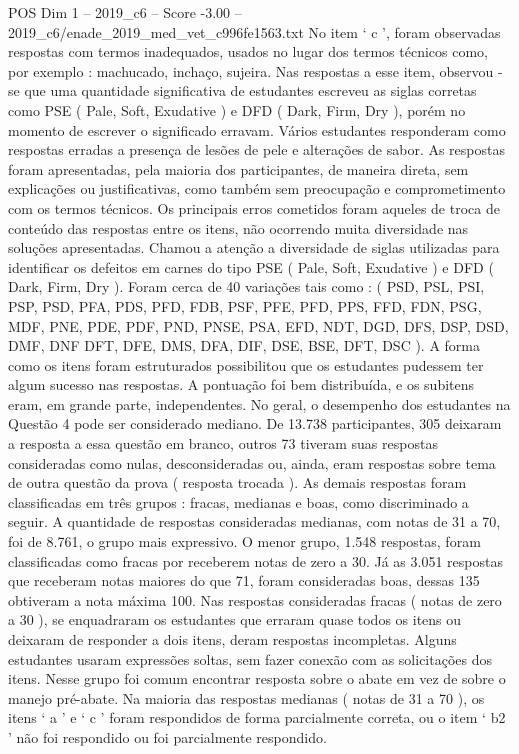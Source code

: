 \begin{textsample}{POS Dim 1 – 2019\_c6 – Score -3.00 – 2019\_c6/enade\_2019\_med\_vet\_c996fe1563.txt}
No item ‘ c ’, foram observadas respostas com termos inadequados, usados no lugar dos termos técnicos como, por exemplo : machucado, inchaço, sujeira.
Nas respostas a esse item, observou -se que uma quantidade significativa de estudantes escreveu as siglas corretas como PSE ( Pale, Soft, Exudative ) e DFD ( Dark, Firm, Dry ), porém no momento de escrever o significado erravam.
Vários estudantes responderam como respostas erradas a presença de lesões de pele e alterações de sabor.
As respostas foram apresentadas, pela maioria dos participantes, de maneira direta, sem explicações ou justificativas, como também sem preocupação e comprometimento com os termos técnicos.
Os principais erros cometidos foram aqueles de troca de conteúdo das respostas entre os itens, não ocorrendo muita diversidade nas soluções apresentadas.
Chamou a atenção a diversidade de siglas utilizadas para identificar os defeitos em carnes do tipo PSE ( Pale, Soft, Exudative ) e DFD ( Dark, Firm, Dry ).
Foram cerca de 40 variações tais como : ( PSD, PSL, PSI, PSP, PSD, PFA, PDS, PFD, FDB, PSF, PFE, PFD, PPS, FFD, FDN, PSG, MDF, PNE, PDE, PDF, PND, PNSE, PSA, EFD, NDT, DGD, DFS, DSP, DSD, DMF, DNF DFT, DFE, DMS, DFA, DIF, DSE, BSE, DFT, DSC ).
A forma como os itens foram estruturados possibilitou que os estudantes pudessem ter algum sucesso nas respostas.
A pontuação foi bem distribuída, e os subitens eram, em grande parte, independentes.
No geral, o desempenho dos estudantes na Questão 4 pode ser considerado mediano.
De 13.738 participantes, 305 deixaram a resposta a essa questão em branco, outros 73 tiveram suas respostas consideradas como nulas, desconsideradas ou, ainda, eram respostas sobre tema de outra questão da prova ( resposta trocada ).
As demais respostas foram classificadas em três grupos : fracas, medianas e boas, como discriminado a seguir.
A quantidade de respostas consideradas medianas, com notas de 31 a 70, foi de 8.761, o grupo mais expressivo.
O menor grupo, 1.548 respostas, foram classificadas como fracas por receberem notas de zero a 30.
Já as 3.051 respostas que receberam notas maiores do que 71, foram consideradas boas, dessas 135 obtiveram a nota máxima 100.
Nas respostas consideradas fracas ( notas de zero a 30 ), se enquadraram os estudantes que erraram quase todos os itens ou deixaram de responder a dois itens, deram respostas incompletas.
Alguns estudantes usaram expressões soltas, sem fazer conexão com as solicitações dos itens.
Nesse grupo foi comum encontrar resposta sobre o abate em vez de sobre o manejo pré-abate.
Na maioria das respostas medianas ( notas de 31 a 70 ), os itens ‘ a ’ e ‘ c ’ foram respondidos de forma parcialmente correta, ou o item ‘ b2 ’ não foi respondido ou foi parcialmente respondido.

\end{textsample}
